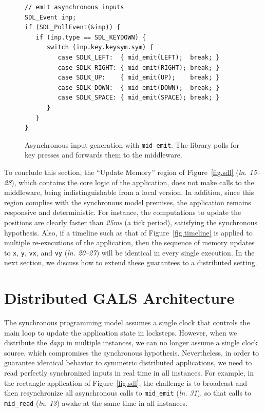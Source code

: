\documentclass[sigplan,screen]{acmart}
\newcommand{\lin}[1]{(\emph{ln. #1}\xspace)}
\newcommand{\dapp}{\emph{dapp}\xspace}
\begin{document}
\begin{figure}[t]
{\scriptsize
\begin{verbatim}
// emit asynchronous inputs
SDL_Event inp;
if (SDL_PollEvent(&inp)) {
   if (inp.type == SDL_KEYDOWN) {
      switch (inp.key.keysym.sym) {
         case SDLK_LEFT:  { mid_emit(LEFT);  break; }
         case SDLK_RIGHT: { mid_emit(RIGHT); break; }
         case SDLK_UP:    { mid_emit(UP);    break; }
         case SDLK_DOWN:  { mid_emit(DOWN);  break; }
         case SDLK_SPACE: { mid_emit(SPACE); break; }
      }
   }
}
\end{verbatim}
}
  \caption{
    \label{fig.input}
    Asynchronous input generation with \texttt{mid\_emit}.
    The library polls for key presses and forwards them to the middleware.
  }
\end{figure}

To conclude this section, the ``Update Memory'' region of Figure~\ref{fig.sdl}
\lin{15--28}, which contains the core logic of the application, does not make
calls to the
middleware, being indistinguishable from a local version.
In addition, since this region complies with the synchronous model premises,
the application remains responsive and deterministic.
For instance, the computations to update the positions are clearly faster than
\emph{25ms} (a tick period), satisfying the synchronous hypothesis.
Also, if a timeline such as that of Figure~\ref{fig.timeline} is applied to
multiple re-executions of the application, then the sequence of memory updates
to \texttt{x}, \texttt{y}, \texttt{vx}, and \texttt{vy} \lin{20--27} will be
identical in every single execution.
In the next section, we discuss how to extend these guarantees to a distributed
setting.

\section{Distributed GALS Architecture}
\label{sec.gals}

The synchronous programming model assumes a single clock that controls the main
loop to update the application state in locksteps.
However, when we distribute the \dapp in multiple instances, we can no longer
assume a single clock source, which compromises the synchronous hypothesis.
%
Nevertheless, in order to guarantee identical behavior to symmetric distributed
applications, we need to read perfectly synchronized inputs in real time in all
instances.
For example, in the rectangle application of Figure~\ref{fig.sdl}, the
challenge is to broadcast and then resynchronize all asynchronous calls to
\texttt{mid\_emit} \lin{31}, so that calls to \texttt{mid\_read} \lin{13} awake
at the same time in all instances.
\end{document}
